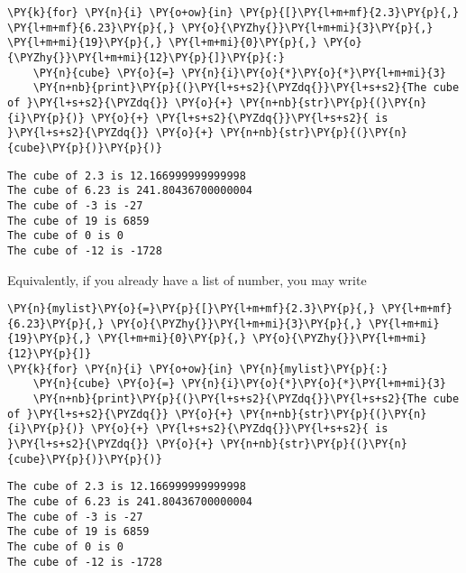     \begin{tcolorbox}[breakable, size=fbox, boxrule=1pt, pad at break*=1mm,colback=cellbackground, colframe=cellborder]
\begin{Verbatim}[commandchars=\\\{\}]
\PY{k}{for} \PY{n}{i} \PY{o+ow}{in} \PY{p}{[}\PY{l+m+mf}{2.3}\PY{p}{,} \PY{l+m+mf}{6.23}\PY{p}{,} \PY{o}{\PYZhy{}}\PY{l+m+mi}{3}\PY{p}{,} \PY{l+m+mi}{19}\PY{p}{,} \PY{l+m+mi}{0}\PY{p}{,} \PY{o}{\PYZhy{}}\PY{l+m+mi}{12}\PY{p}{]}\PY{p}{:}
    \PY{n}{cube} \PY{o}{=} \PY{n}{i}\PY{o}{*}\PY{o}{*}\PY{l+m+mi}{3}
    \PY{n+nb}{print}\PY{p}{(}\PY{l+s+s2}{\PYZdq{}}\PY{l+s+s2}{The cube of }\PY{l+s+s2}{\PYZdq{}} \PY{o}{+} \PY{n+nb}{str}\PY{p}{(}\PY{n}{i}\PY{p}{)} \PY{o}{+} \PY{l+s+s2}{\PYZdq{}}\PY{l+s+s2}{ is }\PY{l+s+s2}{\PYZdq{}} \PY{o}{+} \PY{n+nb}{str}\PY{p}{(}\PY{n}{cube}\PY{p}{)}\PY{p}{)}
\end{Verbatim}
\end{tcolorbox}

    \begin{Verbatim}[commandchars=\\\{\}]
The cube of 2.3 is 12.166999999999998
The cube of 6.23 is 241.80436700000004
The cube of -3 is -27
The cube of 19 is 6859
The cube of 0 is 0
The cube of -12 is -1728
    \end{Verbatim}

    Equivalently, if you already have a list of number, you may write

    \begin{tcolorbox}[breakable, size=fbox, boxrule=1pt, pad at break*=1mm,colback=cellbackground, colframe=cellborder]
\begin{Verbatim}[commandchars=\\\{\}]
\PY{n}{mylist}\PY{o}{=}\PY{p}{[}\PY{l+m+mf}{2.3}\PY{p}{,} \PY{l+m+mf}{6.23}\PY{p}{,} \PY{o}{\PYZhy{}}\PY{l+m+mi}{3}\PY{p}{,} \PY{l+m+mi}{19}\PY{p}{,} \PY{l+m+mi}{0}\PY{p}{,} \PY{o}{\PYZhy{}}\PY{l+m+mi}{12}\PY{p}{]}
\PY{k}{for} \PY{n}{i} \PY{o+ow}{in} \PY{n}{mylist}\PY{p}{:}
    \PY{n}{cube} \PY{o}{=} \PY{n}{i}\PY{o}{*}\PY{o}{*}\PY{l+m+mi}{3}
    \PY{n+nb}{print}\PY{p}{(}\PY{l+s+s2}{\PYZdq{}}\PY{l+s+s2}{The cube of }\PY{l+s+s2}{\PYZdq{}} \PY{o}{+} \PY{n+nb}{str}\PY{p}{(}\PY{n}{i}\PY{p}{)} \PY{o}{+} \PY{l+s+s2}{\PYZdq{}}\PY{l+s+s2}{ is }\PY{l+s+s2}{\PYZdq{}} \PY{o}{+} \PY{n+nb}{str}\PY{p}{(}\PY{n}{cube}\PY{p}{)}\PY{p}{)}
\end{Verbatim}
\end{tcolorbox}

    \begin{Verbatim}[commandchars=\\\{\}]
The cube of 2.3 is 12.166999999999998
The cube of 6.23 is 241.80436700000004
The cube of -3 is -27
The cube of 19 is 6859
The cube of 0 is 0
The cube of -12 is -1728
    \end{Verbatim}

